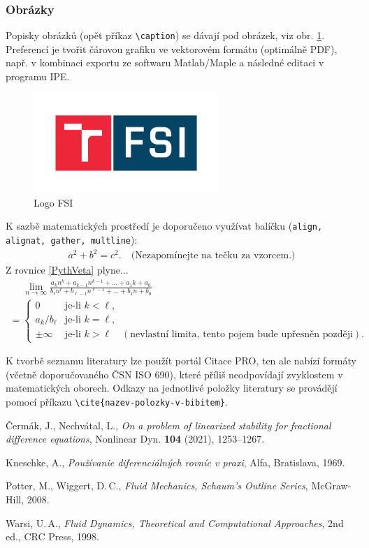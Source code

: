 \documentclass[a4paper,12pt,twoside]{article}
\theoremstyle{definition}
\theoremstyle{remark}
\numberwithin{equation}{section}
\numberwithin{table}{section}
\numberwithin{figure}{section}
\begin{document}
\subsubsection*{Obrázky}
Popisky obrázků (opět příkaz  \verb!\caption!) se dávají pod obrázek, viz obr. \ref{fsi}. Preferencí je tvořit čárovou grafiku ve vektorovém formátu (optimálně PDF), např. v kombinaci exportu ze softwaru  Matlab/Maple a následné editaci v programu IPE.
\begin{figure}[h]
\centering	
\includegraphics[width=7cm]{FSI.pdf}
\caption{Logo FSI}
\label{fsi}
\end{figure}

K sazbě matematických prostředí je doporučeno využívat balíčku  (\texttt{align, alignat, gather, multline}):
\begin{align}\label{PythVeta}
a^2+b^2=c^2.\quad\text{(Nezapomínejte na tečku za vzorcem.)}
\end{align}
Z rovnice \eqref{PythVeta} plyne...
\begin{multline*}
	\phantom{=}\lim_{n\to\infty}\frac{a_kn^k+a_{k-1}n^{k-1}+\dots+a_1k+a_0}{b_\ell n^\ell+b_{\ell-1}
		n^{\ell-1}+\dots+b_1n+b_0}\\
	=
	\begin{cases}
		0 & \text{je-li }k<\ell,\\
		a_k/b_\ell & \text{je-li }k=\ell,\\
		\pm\infty & \text{je-li } k>\ell\quad (\text{nevlastní limita, tento pojem bude upřesněn později}).
	\end{cases}
\end{multline*}


\newpage
\renewcommand{\refname}{Literatura}
K tvorbě seznamu literatury lze použít portál Citace PRO, ten ale nabízí formáty (včetně doporučovaného ČSN ISO 690), které příliš neodpovídají zvyklostem v matematických oborech. Odkazy na jednotlivé položky literatury se provádějí pomocí příkazu \verb!\cite{nazev-polozky-v-bibitem}!. 
\begin{thebibliography}{3}
Čermák, J., Nechvátal, L., {\em On a problem of linearized stability for fractional difference equations}, Nonlinear Dyn. {\bf 104} (2021), 1253--1267.

 Kneschke, A., {\em Používanie diferenciálných rovníc v praxi\/}, Alfa, Bratislava, 1969.

Potter, M., Wiggert, D.\,C., {\em Fluid Mechanics, Schaum’s Outline Series\/}, McGraw-Hill, 2008.

Warsi, U.\,A., {\em Fluid Dynamics, Theoretical and Computational Approaches\/}, 2nd ed., CRC Press, 1998.

\end{thebibliography}
\end{document}
